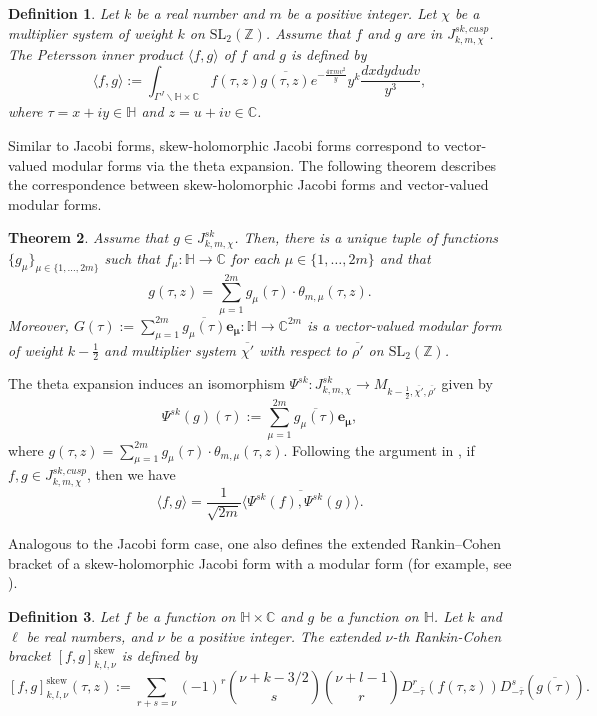\documentclass[11pt]{amsart}
\newtheorem{thm}{Theorem}[section]
\newtheorem{dfn}[thm]{Definition}
\theoremstyle{definition}
\theoremstyle{remark}
\numberwithin{equation}{section}
\renewcommand{\(}{\left(}
\renewcommand{\)}{\right)}
\begin{document}
\begin{dfn}\label{def : def of Petersson inner product Skew - Jacobi}
Let $k$ be a real number and $m$ be a positive integer. 
Let $\chi$ be a multiplier system of weight $k$ on $\mathrm{SL}_{2}(\mathbb{Z})$. 
Assume that $f$ and $g$ are in $J^{sk,cusp}_{k,m,\chi}$. 
The Petersson inner product $\langle f, g \rangle$ of $f$ and $g$ is defined by 
\[ \langle f , g \rangle := \int_{\Gamma^{J}\backslash \mathbb{H}\times \mathbb{C}} f(\tau,z)\overline{g(\tau,z)} e^{-\frac{4\pi m v^2}{y}}y^{k} \frac{dxdydudv}{y^3},  \]
where $\tau=x+iy\in \mathbb{H}$ and $z=u+iv\in \mathbb{C}$. 
\end{dfn}

Similar to Jacobi forms, skew-holomorphic Jacobi forms correspond to vector-valued modular forms via the theta expansion. 
The following theorem describes the correspondence between skew-holomorphic Jacobi forms and vector-valued modular forms. 

\begin{thm}\label{thm 6}\cite[Section 6]{BR}
    Assume that $g\in J^{sk}_{k,m,\chi}$. 
    Then, there is a unique tuple of functions $\{g_{\mu}\}_{\mu\in \{1,\dots, 2m\}}$ such that $f_{\mu} : \mathbb{H}\to \mathbb{C}$ for each $\mu\in \{1,\dots, 2m\}$ and that 
    \[ g(\tau,z)=\sum_{\mu=1}^{2m} g_{\mu}(\tau) \cdot \theta_{m,\mu}(\tau,z). \]
    Moreover, $G(\tau):=\sum_{\mu=1}^{2m} \overline{g_{\mu}(\tau)} \mathbf{e_{\mu}} : \mathbb{H}\to \mathbb{C}^{2m}$ is a vector-valued modular form of weight $k-\frac{1}{2}$ and multiplier system $\overline{\chi'}$ with respect to $\overline{\rho'}$ on $\mathrm{SL}_{2}(\mathbb{Z})$. 
\end{thm}

The theta expansion induces an isomorphism $\Psi^{sk} : J_{k,m,\chi}^{sk}\to M_{k-\frac{1}{2},\overline{\chi'},\overline{\rho'}}$ given by 
\[ \Psi^{sk}(g)(\tau):=\sum_{\mu=1}^{2m} \overline{g_{\mu}(\tau)}\mathbf{e_{\mu}}, \]
where $g(\tau,z)=\sum_{\mu=1}^{2m}g_{\mu}(\tau)\cdot \theta_{m,\mu}(\tau,z)$.
Following the argument in \cite[Theorem 5.3]{EZ1}, if $f,g\in J^{sk,cusp}_{k,m,\chi}$, then we have
\[ \langle f,g \rangle = \frac{1}{\sqrt{2m}}\overline{\langle \Psi^{sk}(f), \Psi^{sk}(g) \rangle}.\]

Analogous to the Jacobi form case, one also defines the extended Rankin–Cohen bracket of a skew-holomorphic Jacobi form with a modular form (for example, see \cite{K}).

\begin{dfn}\cite[Definition 1.1]{K}\label{def 4}
    Let $f$ be a function on $\mathbb{H}\times \mathbb{C}$ and $g$ be a function on $\mathbb{H}$. 
    Let $k$ and $\ell$ be real numbers, and $\nu$ be a positive integer. 
    The extended $\nu$-th Rankin-Cohen bracket $[f,g]^{\mathrm{skew}}_{k,l,\nu}$ is defined by 
    \[ [f,g]^{\mathrm{skew}}_{k,l,\nu}(\tau,z):=\sum_{r+s=\nu}(-1)^r\binom{\nu+k-3/2}{s}\binom{\nu+l-1}{r} D^r_{-\overline{\tau}}(f(\tau,z))D^s_{-\overline{\tau}}(\overline{g(\tau)}).  \]
\end{dfn}
\end{document}

